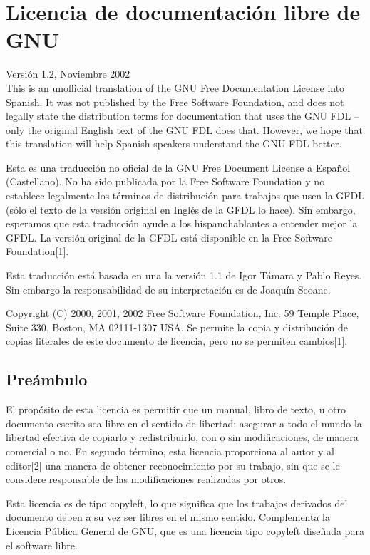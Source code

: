 
\chapter{Licencia de documentación libre de GNU}

Versión 1.2, Noviembre 2002 \\

This is an unofficial translation of the GNU Free Documentation License
into Spanish. It was not published by the Free Software Foundation,
and does not legally state the distribution terms for documentation
that uses the GNU FDL – only the original English text of the GNU
FDL does that. However, we hope that this translation will help Spanish
speakers understand the GNU FDL better.

Esta es una traducción no oficial de la GNU Free Document License
a Español (Castellano). No ha sido publicada por la Free Software
Foundation y no establece legalmente los términos de distribución
para trabajos que usen la GFDL (sólo el texto de la versión original
en Inglés de la GFDL lo hace). Sin embargo, esperamos que esta traducción
ayude a los hispanohablantes a entender mejor la GFDL. La versión
original de la GFDL está disponible en la Free Software Foundation{[}1{]}.

Esta traducción está basada en una la versión 1.1 de Igor Támara y
Pablo Reyes. Sin embargo la responsabilidad de su interpretación es
de Joaquín Seoane.

Copyright (C) 2000, 2001, 2002 Free Software Foundation, Inc. 59 Temple
Place, Suite 330, Boston, MA 02111-1307 USA. Se permite la copia y
distribución de copias literales de este documento de licencia, pero
no se permiten cambios{[}1{]}.


\section*{Preámbulo}

El propósito de esta licencia es permitir que un manual, libro de
texto, u otro documento escrito sea libre en el sentido de libertad:
asegurar a todo el mundo la libertad efectiva de copiarlo y redistribuirlo,
con o sin modificaciones, de manera comercial o no. En segundo término,
esta licencia proporciona al autor y al editor{[}2{]} una manera de
obtener reconocimiento por su trabajo, sin que se le considere responsable
de las modificaciones realizadas por otros.

Esta licencia es de tipo copyleft, lo que significa que los trabajos
derivados del documento deben a su vez ser libres en el mismo sentido.
Complementa la Licencia Pública General de GNU, que es una licencia
tipo copyleft diseñada para el software libre.

